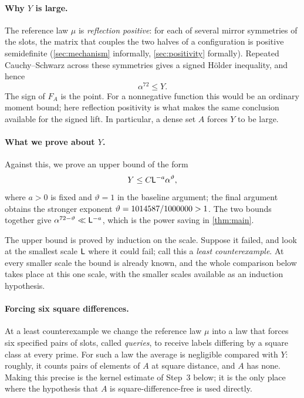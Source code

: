 \paragraph{Why $Y$ is large.}
The reference law $\mu$ is \emph{reflection positive}: for each of
several mirror symmetries of the slots, the matrix that couples the
two halves of a configuration is positive semidefinite
(\cref{sec:mechanism} informally, \cref{sec:positivity} formally).
Repeated Cauchy--Schwarz across these symmetries gives a signed
H\"older inequality, and hence
\[
  \alpha^{72}\le Y.
\]
The sign of $F_A$ is the point. For a nonnegative function this
would be an ordinary moment bound; here reflection positivity is
what makes the same conclusion available for the signed lift.
In particular, a dense set $A$ forces $Y$ to be large.

\paragraph{What we prove about $Y$.}
Against this, we prove an upper bound of the form
\[
  Y\le C\mathsf L^{-a}\alpha^{\vartheta},
\]
where $a>0$ is fixed and $\vartheta=1$ in the baseline argument;
the final argument obtains the stronger exponent
$\vartheta=1014587/1000000>1$. The two bounds together give
$\alpha^{72-\vartheta}\ll\mathsf L^{-a}$, which is the power saving in
\cref{thm:main}.

The upper bound is proved by induction on the scale. Suppose it
failed, and look at the smallest scale $\mathsf L$ where it could fail;
call this a \emph{least counterexample}. At every smaller scale
the bound is already known, and the whole comparison below takes
place at this one scale, with the smaller scales available as an
induction hypothesis.

\paragraph{Forcing six square differences.}
At a least counterexample we change the reference law $\mu$ into a
law that forces six specified pairs of slots, called
\emph{queries}, to receive labels differing by a square class at
every prime. For such a law the average is negligible compared
with $Y$: roughly, it counts pairs of elements of $A$ at square
distance, and $A$ has none. Making this precise is the kernel
estimate of Step~3 below; it is the only place where the hypothesis
that $A$ is square-difference-free is used directly.

